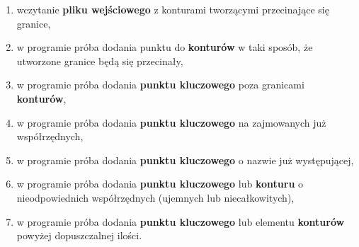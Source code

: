 \documentclass[hidelinks,10pt,a4paper]{article}
\begin{document}
\begin{enumerate}
\item wczytanie \textbf{pliku wejściowego} z konturami tworzącymi przecinające się granice,
\item w programie próba dodania punktu do \textbf{konturów} w taki sposób, że utworzone granice będą się przecinały,
\item w programie próba dodania \textbf{punktu kluczowego} poza granicami \textbf{konturów},
\item w programie próba dodania \textbf{punktu kluczowego} na zajmowanych już współrzędnych, 
\item w programie próba dodania \textbf{punktu kluczowego} o nazwie już występującej,
\item w programie próba dodania \textbf{punktu kluczowego} lub \textbf{konturu} o nieodpowiednich współrzędnych (ujemnych lub niecałkowitych),
\item w programie próba dodania \textbf{punktu kluczowego} lub elementu \textbf{konturów} powyżej dopuszczalnej ilości.

\end{enumerate}
\end{document}
